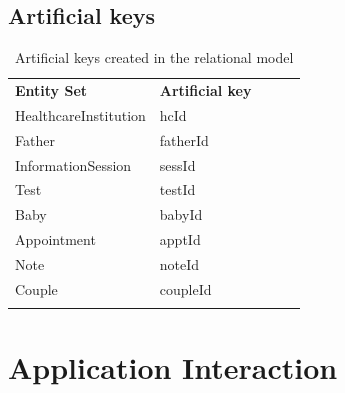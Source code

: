 \documentclass[10pt, letterpaper]{article}
\begin{document}
\subsection*{Artificial keys}
\begin{table}[H]
    \begin{center}
        \begin{tabular}{lllll}
            \cline{1-2}
            \multicolumn{1}{|l|}{\textbf{Entity Set}}   & \multicolumn{1}{l|}{\textbf{Artificial key}} &  &  & \\ \cline{1-2}
            \multicolumn{1}{|l|}{HealthcareInstitution} & \multicolumn{1}{l|}{hcId}                    &  &  & \\ \cline{1-2}
            \multicolumn{1}{|l|}{Father}                & \multicolumn{1}{l|}{fatherId}                &  &  & \\ \cline{1-2}
            \multicolumn{1}{|l|}{InformationSession}    & \multicolumn{1}{l|}{sessId}                  &  &  & \\ \cline{1-2}
            \multicolumn{1}{|l|}{Test}                  & \multicolumn{1}{l|}{testId}                  &  &  & \\ \cline{1-2}
            \multicolumn{1}{|l|}{Baby}                  & \multicolumn{1}{l|}{babyId}                  &  &  & \\ \cline{1-2}
            \multicolumn{1}{|l|}{Appointment}           & \multicolumn{1}{l|}{apptId}                  &  &  & \\ \cline{1-2}
            \multicolumn{1}{|l|}{Note}                  & \multicolumn{1}{l|}{noteId}                  &  &  & \\ \cline{1-2}
            \multicolumn{1}{|l|}{Couple}                & \multicolumn{1}{l|}{coupleId}                &  &  & \\ \cline{1-2}
                                                        &                                              &  &  &
        \end{tabular}
    \end{center}
    \caption{Artificial keys created in the relational model}
\end{table}


\section{Application Interaction}
\end{document}
